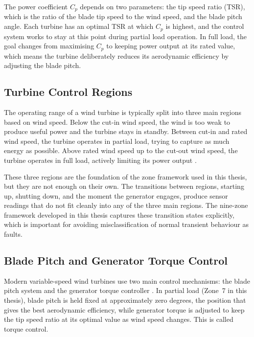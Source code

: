 The power coefficient $C_p$ depends on two parameters: the tip speed ratio (TSR), which
is the ratio of the blade tip speed to the wind speed, and the blade pitch angle. Each
turbine has an optimal TSR at which $C_p$ is highest, and the control system works to
stay at this point during partial load operation. In full load, the goal changes from
maximising $C_p$ to keeping power output at its rated value, which means the turbine
deliberately reduces its aerodynamic efficiency by adjusting the blade pitch.

\subsection{Turbine Control Regions}
\label{subsec:bg:regions}

The operating range of a wind turbine is typically split into three main regions based on
wind speed. Below the cut-in wind speed, the wind is too weak to produce useful power and the
turbine stays in standby. Between cut-in and rated wind speed, the turbine operates in
partial load, trying to capture as much energy as possible. Above rated wind speed up to
the cut-out wind speed, the turbine operates in full load, actively limiting its power
output
\citep{manwell2009}.

These three regions are the foundation of the zone framework used in this thesis, but
they are not enough on their own. The transitions between regions, starting up, shutting
down, and the moment the generator engages, produce sensor readings that do not fit
cleanly into any of the three main regions. The nine-zone framework developed in this
thesis \citep{indrekvam2026} captures these transition states explicitly, which is
important for avoiding misclassification of normal transient behaviour as faults.

\subsection{Blade Pitch and Generator Torque Control}
\label{subsec:bg:control}

Modern variable-speed wind turbines use two main control mechanisms: the blade pitch
system and the generator torque controller \citep{manwell2009}. In partial load (Zone~7 in this thesis),
blade pitch is held fixed at approximately zero degrees, the position that gives the best
aerodynamic efficiency, while generator torque is adjusted to keep the tip speed ratio at
its optimal value as wind speed changes. This is called torque control.

